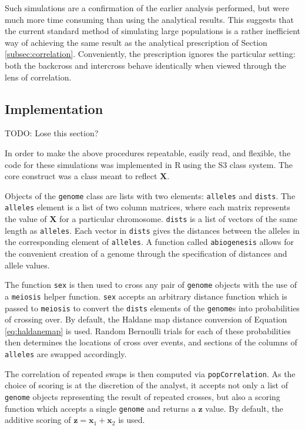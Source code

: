\documentclass{article}
\newcommand{\code}[1]{\texttt{#1}}
\newcommand*{\R}{\textsf{R}$~$}
\newcommand{\ve}[1]{\mathbf{#1}}           %
\newcommand{\m}[1]{\mathbf{#1}}               %
\newcommand{\TODO}[1]{{\color{brickred} TODO:  {#1}}}
\begin{document}
Such simulations are a confirmation of the earlier analysis performed, but were much more time consuming than using the analytical results. This suggests that the current standard method of simulating large populations is a rather inefficient way of achieving the same result as the analytical prescription of Section \ref{subsec:correlation}. Conveniently, the prescription ignores the particular setting: both the backcross and intercross behave identically when viewed through the lens of correlation.

\subsection{Implementation}

\TODO{Lose this section?}

In order to make the above procedures repeatable, easily read, and flexible, the code for these simulations was implemented in \R using the S3 class system. The core construct was a class meant to reflect $\m{X}$.

Objects of the \code{genome} class are lists with two elements: \code{alleles} and \code{dists}. The \code{alleles} element is a list of two column matrices, where each matrix represents the value of $\m{X}$ for a particular chromosome. \code{dists} is a list of vectors of the same length as \code{alleles}. Each vector in \code{dists} gives the distances between the alleles in the corresponding element of \code{alleles}. A function called \code{abiogenesis} allows for the convenient creation of a genome through the specification of distances and allele values.

The function \code{sex} is then used to cross any pair of \code{genome} objects with the use of a \code{meiosis} helper function. \code{sex} accepts an arbitrary distance function which is passed to \code{meiosis} to convert the \code{dists} elements of the \code{genome}s into probabilities of crossing over. By default, the Haldane map distance conversion of Equation \ref{eq:haldanemap} is used. Random Bernoulli trials for each of these probabilities then determines the locations of cross over events, and sections of the columns of \code{alleles} are swapped accordingly.

The correlation of repeated swaps is then computed via \code{popCorrelation}. As the choice of scoring is at the discretion of the analyst, it accepts not only a list of \code{genome} objects representing the result of repeated crosses, but also a scoring function which accepts a single \code{genome} and returns a $\ve{z}$ value. By default, the additive scoring of $\ve{z} = \ve{x}_1 + \ve{x}_2$ is used.
\end{document}
